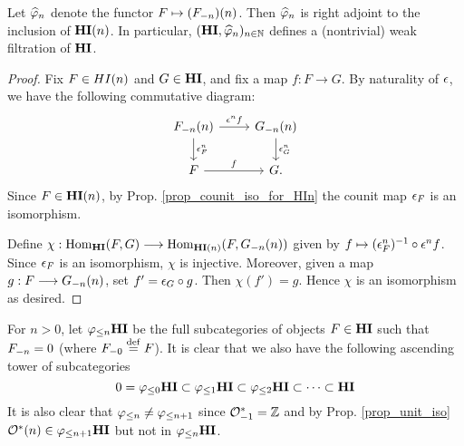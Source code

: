 \begin{prop}
Let $\sgHI{n}$ denote the functor $F \mapsto 
\LHI[n]{(\RHI[n]{F})}$. Then $\sgHI{n}$ is right adjoint to the 
inclusion of $\LHI[n]{\HI}$. In particular, $(\HI, \sgHI{n})_{n 
\in \N}$ defines a (nontrivial) weak filtration of $\HI$.
\end{prop}
\begin{proof}
Fix $F \in \LHI[n]{HI}$ and $G \in \HI$, and fix a map $f : 
F \to G$. By naturality of $\cuHI$, we have the following 
commutative diagram:
\[
\begin{tikzcd}
\LHI[n]{\RHI[n]{F}} \arrow{r}{\cuHI^n f}\arrow{d}{\cuHI^n_F} 
& \LHI[n]{\RHI[n]{G}} \arrow{d}{\cuHI^n_G} \\
F \arrow{r}{f}
& G.
\end{tikzcd}
\]
Since $F \in \LHI[n]{\HI}$, by Prop. \ref{prop_counit_iso_for_HIn} 
the counit map $\cuHI_F$ is an isomorphism.

Define $\chi: \homHI(F, G) \to \hom_{\LHI[n]{\HI}}(F, 
\LHI[n]{\RHI[n]{G}})$ given by $f \mapsto (\cuHI^n_F)^{-1} \comp 
\cuHI^n f$. Since $\cuHI_F$ is an isomorphism, $\chi$ is 
injective. Moreover, given a map $g: F \to \LHI[n]{\RHI[n]{G}}$,
set $f' = \cuHI_G \comp g$. Then $\chi(f') = g$. Hence $\chi$
is an isomorphism as desired.
\end{proof}

For $n > 0$, let $\tlHI{n}\HI$ be the full subcategories of 
objects $F \in \HI$ such that $\RHI[n]{F} = 0$ (where $\RHI[0]{F} 
\defeq F$). It is clear that we also have the following ascending 
tower of subcategories
\[
0 = \tlHI{0}\HI \subset \tlHI{1}\HI \subset \tlHI{2}\HI \subset 
   \cdots \subset \HI
\]
It is also clear that $\tlHI{n} \neq \tlHI{n + 1}$ since 
$\RHI{\Ox} = \Z$ and by Prop. \ref{prop_unit_iso} $\LHI[n]{\Ox} 
\in \tlHI{n + 1}\HI$ but not in $\tlHI{n}\HI$.

